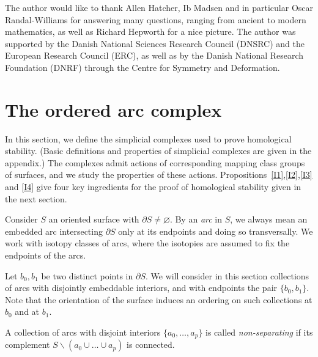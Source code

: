 \documentclass[10pt]{amsart}
\newcommand{\minus}{\backslash}
\newcommand{\del}{\partial}
\newcommand{\emp}{\varnothing}
\begin{document}
\medskip

The author would like to thank Allen Hatcher, Ib Madsen and in particular 
Oscar Randal-Williams for answering  many questions, 
ranging from  ancient to modern mathematics, as well as Richard Hepworth for a
nice picture. The author was supported by the
Danish National Sciences Research Council  (DNSRC) and the European
Research Council (ERC), as well as by the Danish National Research Foundation (DNRF) through the Centre for Symmetry and Deformation. 











\section{The ordered arc complex}\label{ordsect}

In this section, we define the simplicial complexes used to prove homological stability. (Basic definitions and properties of
simplicial complexes are given in the appendix.) The complexes admit actions of corresponding 
mapping class groups of surfaces, and we study the properties of these actions. Propositions~\ref{I1},\ref{I2},\ref{I3} and \ref{I4}
give four key ingredients for the proof of homological stability given in the next section. 

\medskip



Consider $S$ an oriented surface with $\del S\neq\emp$. By an {\em arc} in $S$, we always mean an embedded arc intersecting $\del S$
only at its endpoints and doing so transversally. We work with isotopy classes of arcs, where the isotopies are assumed to fix the 
endpoints of the arcs. 

Let $b_0,b_1$ be two distinct points in $\del S$. We will consider in this section 
collections of arcs with disjointly embeddable interiors, and with endpoints the pair 
$\{b_0,b_1\}$. 
Note that the orientation of the surface induces an ordering on such collections at $b_0$ and at $b_1$.

A collection of arcs with disjoint interiors $\{a_0,\dots,a_p\}$ is called {\em non-separating} if
its  complement  $S\minus(a_0\cup \dots\cup a_p)$ is connected. 
\end{document}
